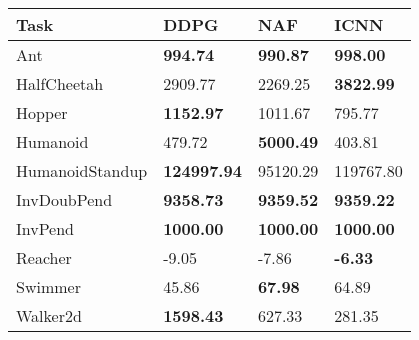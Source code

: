 \begin{tabular}[c]{@{}llll@{}}
Task & DDPG & NAF & ICNN \\ \hline
Ant & \textbf{994.74} & \textbf{990.87} & \textbf{998.00} \\
HalfCheetah & 2909.77 & 2269.25 & \textbf{3822.99} \\
Hopper & \textbf{1152.97} & 1011.67 & 795.77 \\
Humanoid & 479.72 & \textbf{5000.49} & 403.81 \\
HumanoidStandup & \textbf{124997.94} & 95120.29 & 119767.80 \\
InvDoubPend & \textbf{9358.73} & \textbf{9359.52} & \textbf{9359.22} \\
InvPend & \textbf{1000.00} & \textbf{1000.00} & \textbf{1000.00} \\
Reacher & -9.05 & -7.86 & \textbf{-6.33} \\
Swimmer & 45.86 & \textbf{67.98} & 64.89 \\
Walker2d & \textbf{1598.43} & 627.33 & 281.35 \\
\end{tabular}
